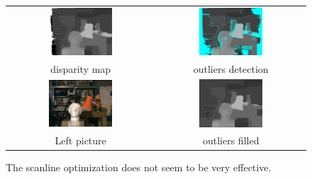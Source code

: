 \documentclass{ipol}
\begin{document}
\begin{figure}[h]
\begin{center}	
\begin{tabular}{cc}
\includegraphics[width=0.45\textwidth]{Images/tsukuba/disparity_map_ADCensus_aggregated_so.png} &
\includegraphics[width=0.45\textwidth]{Images/tsukuba/disparity_occlusion_ADCensus_aggregated_so.png} \\
disparity map & outliers detection \\
\includegraphics[width=0.45\textwidth]{Images/pictures/tsukuba.png} &
\includegraphics[width=0.45\textwidth]{Images/tsukuba/disparity_occlusion_filled_smoothed_ADCensus_aggregated_so.png}\\
Left picture & outliers filled
\end{tabular}
	\caption{The scanline optimization does not seem to be very effective.}
	\label{refinePics}
\end{center}
\end{figure}
\end{document}
